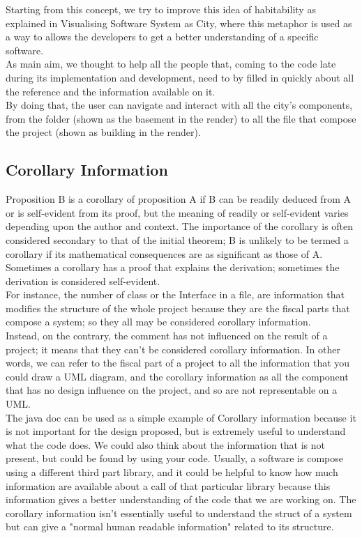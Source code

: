 \documentclass[]{usiinfbachelorproject}
\begin{document}
Starting from this concept, we try to improve this idea of habitability as explained in \cite{vssac} Visualising Software System as City, where this metaphor is used as a way to allows the developers to get a better understanding of a specific software. \\
As main aim, we thought to help all the people that, coming to the code late during its implementation and development, need to by filled in quickly about all the reference and the information available on it.\\
By doing that, the user can navigate and interact with all the city's components, from the folder (shown as the basement in the render) to all the file that compose the project (shown as building in the render). 


\subsection{Corollary Information} 
Proposition B is a corollary of proposition A if B can be readily deduced from A or is self-evident from its proof, but the meaning of readily or self-evident varies depending upon the author and context. The importance of the corollary is often considered secondary to that of the initial theorem; B is unlikely to be termed a corollary if its mathematical consequences are as significant as those of A. Sometimes a corollary has a proof that explains the derivation; sometimes the derivation is considered self-evident. \cite{wikiCory}\\

For instance, the number of class or the Interface in a file, are information that modifies the structure of the whole project because they are the fiscal parts that compose a system; so they all may be considered corollary information. \\
Instead, on the contrary, the comment has not influenced on the result of a project; it means that they can't be considered corollary information. 
In other words, we can refer to the fiscal part of a project to all the information that you could draw a UML diagram, and the corollary information as all the component that has no design influence on the project, and so are not representable on a UML.\\
The java doc can be used as a simple example of Corollary information  because it is not important for the design proposed, but is extremely useful to understand what the code does. We could also think about the information that is not present, but could be found by using your code. Usually, a software is compose using a different third part library, and it could be helpful to know how much information are available about a call of that particular library because this information gives a better understanding of the code that we are working on. 
The corollary information isn't essentially useful to understand the struct of a system but can give a "normal human readable information" related to its structure.
\end{document}
